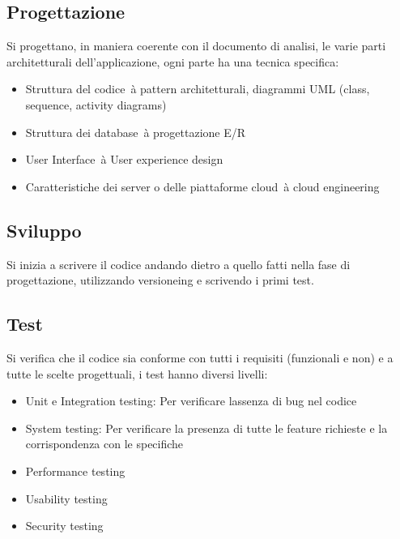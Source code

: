 \documentclass[
]{article}
\providecommand{\tightlist}{%
  \setlength{\itemsep}{0pt}\setlength{\parskip}{0pt}}
\begin{document}
{}

\subsection{\texorpdfstring{{Progettazione}}{Progettazione}}\label{h.1wp42y42lw7v}

{Si progettano, in maniera coerente con il documento di analisi, le
varie parti architetturali dell'applicazione, ogni parte ha una tecnica
specifica:}

\begin{itemize}
\tightlist
\item
  {Struttura del codice}{~à pattern architetturali, diagrammi UML
  (class, sequence, activity diagrams) }
\item
  {Struttura dei database}{~à progettazione E/R }
\item
  {User Interface}{~à User experience design }
\item
  {Caratteristiche dei server o delle piattaforme cloud}{~à cloud
  engineering}
\end{itemize}

{}

\subsection{\texorpdfstring{{Sviluppo}}{Sviluppo}}\label{h.f2g4hiuuvqh7}

{Si inizia a scrivere il codice andando dietro a quello fatti nella fase
di progettazione, utilizzando versioneing e scrivendo i primi test.}

{}

\subsection{\texorpdfstring{{Test}}{Test}}\label{h.t5n6rgl4izvw}

{Si verifica che il codice sia conforme con tutti i requisiti
(funzionali e non) e a tutte le scelte progettuali, i test hanno diversi
livelli:}

\begin{itemize}
\tightlist
\item
  {Unit e Integration testing}{: Per verificare
  l\textquotesingle assenza di bug nel codice }
\item
  {System testing}{: Per verificare la presenza di tutte le feature
  richieste e la corrispondenza con le specifiche }
\item
  {Performance testing }
\item
  {Usability testing }
\item
  {Security testing}
\end{itemize}
\end{document}
